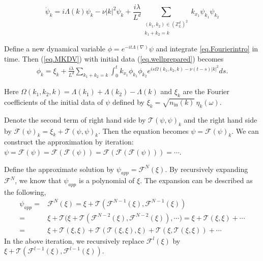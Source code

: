 \begin{equation}\label{eq.Fourierintro}
\dot{\psi}_{k} =  i\Lambda(k) \psi_k -\nu |k|^2 \psi_k
 +\frac{i\lambda}{L^{d}} \sum\limits_{\substack{(k_1,k_2) \in (\mathbb{Z}^d_L)^2 \\ k_1 + k_2 = k}} k_{x_1}\psi_{k_1} \psi_{k_2}
\end{equation}



Define a new dynamical variable $\phi= e^{-it\Lambda(\nabla)} \psi$ and integrate \eqref{eq.Fourierintro} in time. Then (\ref{eq.MKDV}) with initial data (\ref{eq.wellprepared}) becomes
\begin{equation}\label{eq.intmainintro}
\begin{split}
    \phi_k =\xi_k+\frac{i\lambda}{L^{d}} \sum\limits_{k_1 + k_2 = k}\int^{t}_0k_{x_1}\phi_{k_1} \phi_{k_2}e^{i s\Omega(k_1,k_2,k)-\nu(t-s)|k|^2} ds.  
\end{split}
\end{equation}

Here $\Omega(k_1,k_2,k) =\Lambda(k_1)+\Lambda(k_2)-\Lambda(k)$ and $\xi_k$ are the Fourier coefficients of the initial data of $\psi$ defined by $\xi_k=\sqrt{n_{\textrm{in}}(k)} \, \eta_{k}(\omega)$.



Denote the second term of right hand side by $\mathcal{T}(\psi,\psi)_k$ and the right hand side by $\mathcal{F}(\psi)_k=\xi_k+\mathcal{T}(\psi,\psi)_k$. Then the equation becomes $\psi=\mathcal{F}(\psi)_k$. We can construct the approximation by iteration: $\psi=\mathcal{F}(\psi)=\mathcal{F}(\mathcal{F}(\psi))=\mathcal{F}(\mathcal{F}(\mathcal{F}(\psi)))=\cdots$. 

Define the approximate solution by $\psi_{app}=\mathcal{F}^{N}(\xi)$. By recursively expanding  $\mathcal{F}^{N}$, we know that $\psi_{app}$ is a polynomial of $\xi$.
The expansion can be described as the following,
\begin{equation*}
\begin{split}
    \psi_{app}=&\mathcal{F}^{N}(\xi)=\xi+\mathcal{T}(\mathcal{F}^{N-1}(\xi),\mathcal{F}^{N-1}(\xi))
    \\
    =&\xi+\mathcal{T}\Big(\xi+\mathcal{T}(\mathcal{F}^{N-2}(\xi),\mathcal{F}^{N-2}(\xi)),
    \cdots\Big)=\xi+\mathcal{T}(\xi,\xi)+\cdots
    \\
    =&\xi+\mathcal{T}(\xi,\xi)+\mathcal{T}(\mathcal{T}(\xi,\xi),\xi)
    +\mathcal{T}(\xi,\mathcal{T}(\xi,\xi))+\cdots
\end{split}    
\end{equation*}
In the above iteration, we recursively replace $\mathcal{F}^{l}(\xi)$ by $\xi+\mathcal{T}(\mathcal{F}^{l-1}(\xi),\mathcal{F}^{l-1}(\xi))$.

